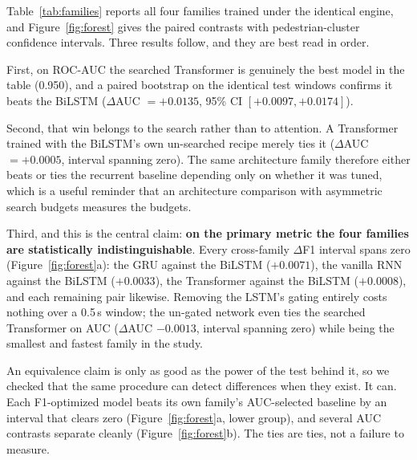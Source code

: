\documentclass[mti,article,submit,moreauthors]{Definitions/mdpi}
\begin{document}
Table~\ref{tab:families} reports all four families trained under the identical engine, and Figure~\ref{fig:forest} gives the paired contrasts with pedestrian-cluster confidence intervals. Three results follow, and they are best read in order.

First, on ROC-AUC the searched Transformer is genuinely the best model in the table (0.950), and a paired bootstrap on the identical test windows confirms it beats the BiLSTM ($\Delta$AUC $= +0.0135$, 95\% CI $[+0.0097, +0.0174]$).

Second, that win belongs to the search rather than to attention. A Transformer trained with the BiLSTM's own un-searched recipe merely ties it ($\Delta$AUC $= +0.0005$, interval spanning zero). The same architecture family therefore either beats or ties the recurrent baseline depending only on whether it was tuned, which is a useful reminder that an architecture comparison with asymmetric search budgets measures the budgets.

Third, and this is the central claim: \textbf{on the primary metric the four families are statistically indistinguishable}. Every cross-family $\Delta$F1 interval spans zero (Figure~\ref{fig:forest}a): the GRU against the BiLSTM ($+0.0071$), the vanilla RNN against the BiLSTM ($+0.0033$), the Transformer against the BiLSTM ($+0.0008$), and each remaining pair likewise. Removing the LSTM's gating entirely costs nothing over a 0.5\,s window; the un-gated network even ties the searched Transformer on AUC ($\Delta$AUC $-0.0013$, interval spanning zero) while being the smallest and fastest family in the study.

An equivalence claim is only as good as the power of the test behind it, so we checked that the same procedure can detect differences when they exist. It can. Each F1-optimized model beats its own family's AUC-selected baseline by an interval that clears zero (Figure~\ref{fig:forest}a, lower group), and several AUC contrasts separate cleanly (Figure~\ref{fig:forest}b). The ties are ties, not a failure to measure.
\end{document}
